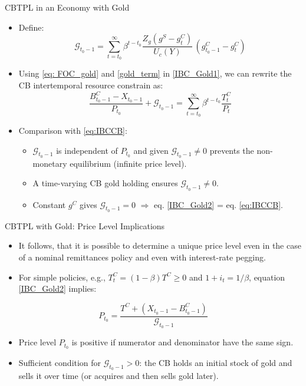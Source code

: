 \documentclass[11pt,aspectratio=169]{beamer}
\begin{document}
\begin{frame}{CBTPL in an Economy with Gold}
\begin{itemize}
    \item Define:
    \begin{equation} \label{gold_term}
        \mathcal{G}_{t_0-1} = \sum_{t=t_0}^{\infty} \beta^{t-t_0} 
        \frac{Z_g(g^S - g_t^C)}{U_c(Y)} \,(g_{t_0-1}^C - g_t^C)
    \end{equation}

    \item Using \eqref{eq: FOC_gold} and \eqref{gold_term} in \eqref{IBC_Gold1}, we can rewrite the CB intertemporal resource constrain as:
    \begin{equation}
        \frac{B_{t_0-1}^C - X_{t_0-1}}{P_{t_0}} + \mathcal{G}_{t_0-1} =
        \sum_{t=t_0}^{\infty} \beta^{t-t_0} \frac{T_t^C}{P_t} 
        \label{IBC_Gold2}
    \end{equation}

    \item Comparison with \eqref{eq:IBCCB}:
    \begin{itemize}
        \item $\mathcal{G}_{t_0-1}$ is independent of $P_{t_0}$ and given $\mathcal{G}_{t_0-1} \neq 0$ prevents the non-monetary equilibrium (infinite price level).  
        \item A time-varying CB gold holding ensures $\mathcal{G}_{t_0-1} \neq 0$.  
        \item Constant $g^C$ gives $\mathcal{G}_{t_0-1} = 0$ $\Rightarrow$ eq. \eqref{IBC_Gold2} = eq. \eqref{eq:IBCCB}.
    \end{itemize}
\end{itemize}
\end{frame}

\begin{frame}{CBTPL with Gold: Price Level Implications}
\begin{itemize}
    \item It follows, that it is possible to determine a unique price level even in the case of a nominal remittances policy and even with interest-rate pegging.
    \vspace{0.2cm}
    \item For simple policies, e.g., $T_t^C = (1-\beta) T^C \ge 0$ and $1+i_t = 1/\beta$, equation \eqref{IBC_Gold2} implies:
\end{itemize}
\begin{equation}
P_{t_0} = \frac{T^C + (X_{t_0-1} - B_{t_0-1}^C)}{\mathcal{G}_{t_0-1}}
\end{equation}
\begin{itemize}
    \item Price level $P_{t_0}$ is positive if numerator and denominator have the same sign.  
    \item Sufficient condition for $\mathcal{G}_{t_0-1} > 0$: the CB holds an initial stock of gold and sells it over time (or acquires and then sells gold later).  
\end{itemize}
\end{frame}
\end{document}
